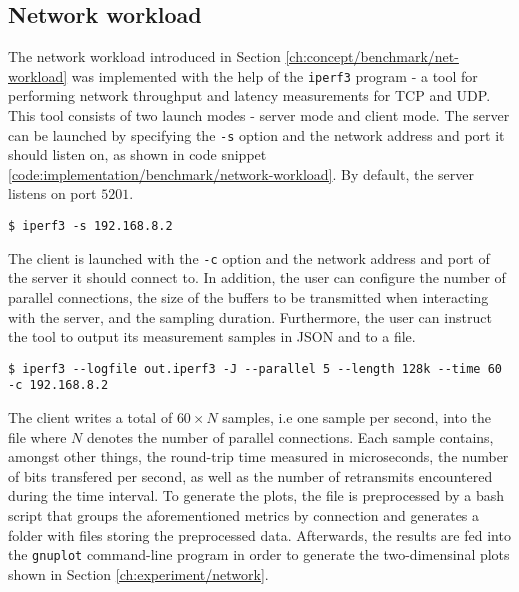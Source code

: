 \subsection{Network workload}
The network workload introduced in Section \ref{ch:concept/benchmark/net-workload} 
was implemented with the help of the \verb|iperf3| program - a tool 
for performing network throughput and latency measurements for TCP and UDP.
This tool consists of two launch modes - server mode and client mode. 
The server can be launched by specifying the \verb|-s| option and the 
network address and port it should listen on, as shown in code snippet \ref{code:implementation/benchmark/network-workload}. 
By default, the server listens on port $5201$. 
\begin{lstlisting}[label={code:implementation/benchmark/network-workload}, style=bash, caption={Launching an iperf3 TCP server}]
$ iperf3 -s 192.168.8.2
\end{lstlisting}
The client is launched with the \verb|-c| option and the network address and port 
of the server it should connect to. In addition, the user can configure the 
number of parallel connections, the size of the buffers to be transmitted 
when interacting with the server, and the sampling duration. Furthermore,
the user can instruct the tool to output its measurement samples in JSON and to a file.
\begin{lstlisting}[label={code:implementation/benchmark/network-workload}, style=bash, caption={Launching an iperf3 TCP client that connects to an iperf3 server listening on 192.168.8.2 and writes performance samples gathered for 60 seconds from 5 parallel connections into a file}]
$ iperf3 --logfile out.iperf3 -J --parallel 5 --length 128k --time 60 -c 192.168.8.2
\end{lstlisting}
The client writes a total of $60 \times N$ samples, i.e one sample per second, into the file where $N$ denotes the number of 
parallel connections. Each sample contains, amongst other things, the round-trip time measured in microseconds, the 
number of bits transfered per second, as well as the number of retransmits encountered during the time interval. 
To generate the plots, the file is preprocessed by a bash script that groups the aforementioned metrics
by connection and generates a folder with files storing the preprocessed data. Afterwards, the results are fed into the 
\verb|gnuplot| command-line program in order to generate the two-dimensinal plots shown in Section \ref{ch:experiment/network}.

